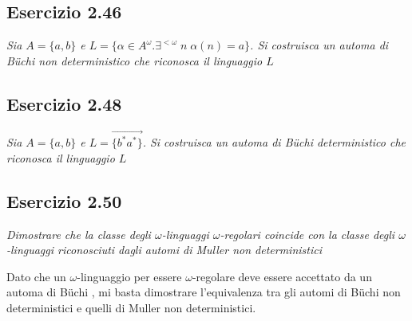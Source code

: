\documentclass[12pt]{article}
\newcommand{\buchi}{B\"uchi }
\begin{document}
\subsection*{Esercizio 2.46}
\textit{Sia $A=\{a,b\}$ e $L=\{\alpha \in A^\omega. \exists^{<\omega}\;n\;\alpha(n)=a\}$. Si costruisca un automa di \buchi non deterministico che riconosca il linguaggio $L$}
 
\begin{center}
\end{center}


\subsection*{Esercizio 2.48}
\textit{Sia $A=\{a,b\}$ e $L=\overrightarrow{\{b^*a^*\}}$. Si costruisca un automa di \buchi deterministico che riconosca il linguaggio $L$}

\begin{center}
\end{center}


\subsection*{Esercizio 2.50}
\textit{Dimostrare che la classe degli $\omega$-linguaggi $\omega$-regolari coincide con la classe degli $\omega$-linguaggi riconosciuti dagli automi di Muller non deterministici}

Dato che un $\omega$-linguaggio per essere $\omega$-regolare deve essere accettato da un automa di \buchi, mi basta dimostrare l'equivalenza tra gli automi di \buchi non deterministici e quelli di Muller non deterministici.
\end{document}
